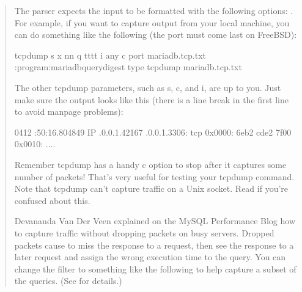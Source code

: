 \documentclass[letterpaper,10pt,english]{sphinxmanual}
\begin{document}
\begin{fulllineitems}
\begin{quote}
The parser expects the input to be formatted with the following options: .  For example, if you want to capture output from your local machine,
you can do something like the following (the port must come last on FreeBSD):

\begin{sphinxVerbatim}[commandchars=\\\{\}]
tcpdump \PYGZhy{}s  \PYGZhy{}x \PYGZhy{}nn \PYGZhy{}q \PYGZhy{}tttt \PYGZhy{}i any \PYGZhy{}c  port  
  \PYGZgt{} mariadb.tcp.txt
:program:mariadb\PYGZhy{}query\PYGZhy{}digest \PYGZhy{}\PYGZhy{}type tcpdump mariadb.tcp.txt
\end{sphinxVerbatim}

The other tcpdump parameters, such as \sphinxhyphen{}s, \sphinxhyphen{}c, and \sphinxhyphen{}i, are up to you.  Just make
sure the output looks like this (there is a line break in the first line to
avoid man\sphinxhyphen{}page problems):

\begin{sphinxVerbatim}[commandchars=\\\{\}]
\PYGZhy{}04\PYGZhy{}12 :50:16.804849 IP .0.0.1.42167
       \PYGZgt{} .0.0.1.3306: tcp 
    0x0000:    6eb2   cde2 7f00 
    0x0010:  ....
\end{sphinxVerbatim}

Remember tcpdump has a handy \sphinxhyphen{}c option to stop after it captures some number of
packets!  That’s very useful for testing your tcpdump command.  Note that
tcpdump can’t capture traffic on a Unix socket.  Read
 if you’re confused about this.

Devananda Van Der Veen explained on the MySQL Performance Blog how to capture
traffic without dropping packets on busy servers.  Dropped packets cause
 to miss the response to a request, then see the response to a
later request and assign the wrong execution time to the query.  You can change
the filter to something like the following to help capture a subset of the
queries.  (See  for details.)


\end{quote}
\end{fulllineitems}
\end{document}
